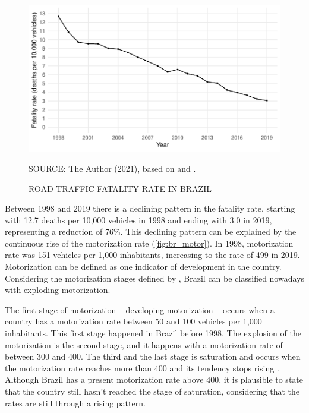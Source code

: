 \begin{figure}[!htbp]
    \centering\footnotesize
    \captionsetup{font=footnotesize}
    \caption{ROAD TRAFFIC FATALITY RATE IN BRAZIL}
    \includegraphics{fig/brazil_fatality.pdf}
    \label{fig:br_fatal}
    \par SOURCE: The Author (2021), based on \textcite{MinistryofHealth2020} and \textcite{DENATRAN2020}.
\end{figure}                                

Between 1998 and 2019 there is a declining pattern in the fatality rate, starting with 12.7 deaths per 10,000 vehicles in 1998 and ending with 3.0 in 2019, representing a reduction of 76\%. This declining pattern can be explained by the continuous rise of the motorization rate (\autoref{fig:br_motor}). In 1998, motorization rate was 151 vehicles per 1,000 inhabitants, increasing to the rate of 499 in 2019. Motorization can be defined as one indicator of development in the country. Considering the motorization stages defined by \textcite{Jorgensen2005}, Brazil can be classified nowadays with exploding motorization. 

The first stage of motorization – developing motorization – occurs when a country has a motorization rate between 50 and 100 vehicles per 1,000 inhabitants. This first stage happened in Brazil before 1998. The explosion of the motorization is the second stage, and it happens with a motorization rate of between 300 and 400. The third and the last stage is saturation and occurs when the motorization rate reaches more than 400 and its tendency stops rising \cite{Jorgensen2005}. Although Brazil has a present motorization rate above 400, it is plausible to state that the country still hasn't reached the stage of saturation, considering that the rates are still through a rising pattern. 

